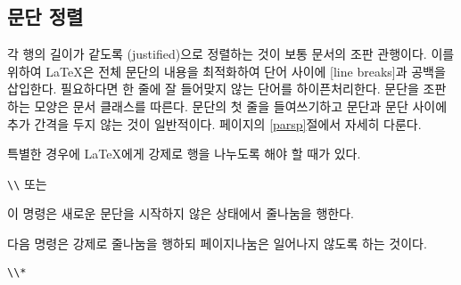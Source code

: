 \subsection{문단 정렬}

각 행의 길이가 같도록 (justified)으로 정렬하는 것이 보통 문서의 조판 관행이다.
이를 위하여 \LaTeX 은 전체 문단의 내용을 최적화하여 단어 사이에 [line breaks]과 
공백을 삽입한다. 필요하다면 한 줄에 잘 들어맞지 않는 단어를 하이픈처리한다.
문단을 조판하는 모양은 문서 클래스를 따른다. 
문단의 첫 줄을 들여쓰기하고 문단과 문단 사이에 추가 간격을 두지 않는 것이 일반적이다.
\pageref{parsp}페이지의 \ref{parsp}절에서 자세히 다룬다.

특별한 경우에 \LaTeX 에게 강제로 행을 나누도록 해야 할 때가 있다.
\begin{lscommand}
\verb|\\| 또는 
\end{lscommand}
\noindent 이 명령은 새로운 문단을 시작하지 않은 상태에서 줄나눔을 행한다.

다음 명령은 강제로 줄나눔을 행하되 페이지나눔은 일어나지 않도록 하는 것이다.
\begin{lscommand}
\verb|\\*|
\end{lscommand}

